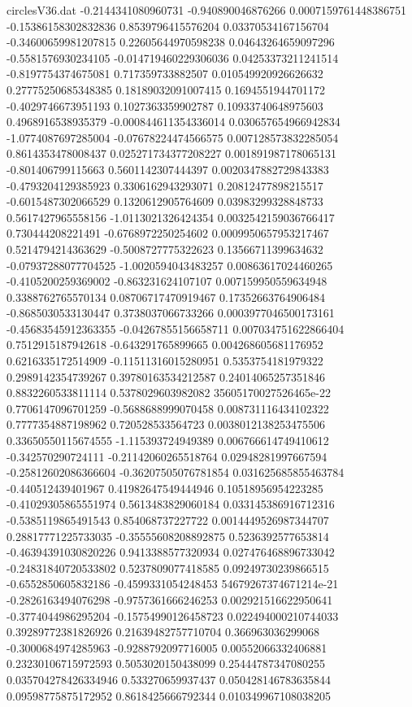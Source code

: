 \begin{filecontents}{circlesV36.dat}
-0.2144341080960731	-0.940890046876266	0.0007159761448386751
-0.15386158302832836	0.8539796415576204	0.03370534167156704
-0.34600659981207815	0.22605644970598238	0.04643264659097296
-0.5581576930234105	-0.014719460229306036	0.04253373211241514
-0.8197754374675081	0.717359733882507	0.010549920926626632
0.27775250685348385	0.18189032091007415	0.1694551944701172
-0.4029746673951193	0.1027363359902787	0.10933740648975603
0.4968916538935379	-0.000844611354336014	0.030657654966942834
-1.0774087697285004	-0.07678224474566575	0.007128573832285054
0.8614353478008437	0.025271734377208227	0.001891987178065131
-0.801406799115663	0.5601142307444397	0.0020347882729843383
-0.4793204129385923	0.3306162943293071	0.20812477898215517
-0.6015487302066529	0.1320612905764609	0.03983299328848733
0.5617427965558156	-1.0113021326424354	0.0032542159036766417
0.730444208221491	-0.6768972250254602	0.0009950657953217467
0.5214794214363629	-0.5008727775322623	0.13566711399634632
-0.07937288077704525	-1.0020594043483257	0.00863617024460265
-0.4105200259369002	-0.863231624107107	0.007159950559634948
0.3388762765570134	0.08706717470919467	0.17352663764906484
-0.8685030533130447	0.3738037066733266	0.0003977046500173161
-0.45683545912363355	-0.04267855156658711	0.007034751622866404
0.7512915187942618	-0.643291765899665	0.004268605681176952
0.6216335172514909	-0.11511316015280951	0.5353754181979322
0.2989142354739267	0.39780163534212587	0.24014065257351846
0.8832260533811114	0.5378029603982082	35605170027526465e-22
0.7706147096701259	-0.5688688999070458	0.008731116434102322
0.7777354887198962	0.720528533564723	0.0038012138253475506
0.33650550115674555	-1.115393724949389	0.006766614749410612
-0.342570290724111	-0.21142060265518764	0.02948281997667594
-0.25812602086366604	-0.36207505076781854	0.031625685855463784
-0.440512439401967	0.41982647549444946	0.10518956954223285
-0.41029305865551974	0.5613483829060184	0.033145386916712316
-0.5385119865491543	0.854068737227722	0.0014449526987344707
0.28817771225733035	-0.35555608208892875	0.5236392577653814
-0.46394391030820226	0.9413388577320934	0.027476468896733042
-0.24831840720533802	0.5237809077418585	0.09249730239866515
-0.6552850605832186	-0.4599331054248453	54679267374671214e-21
-0.2826163494076298	-0.9757361666246253	0.002921516622950641
-0.3774044986295204	-0.15754990126458723	0.022494000210744033
0.39289772381826926	0.21639482757710704	0.366963036299068
-0.3000684974285963	-0.9288792097716005	0.00552066332406881
0.23230106715972593	0.5053020150438099	0.25444787347080255
0.035704278426334946	0.533270659937437	0.050428146783635844
0.09598775875172952	0.8618425666792344	0.010349967108038205

\end{filecontents}
